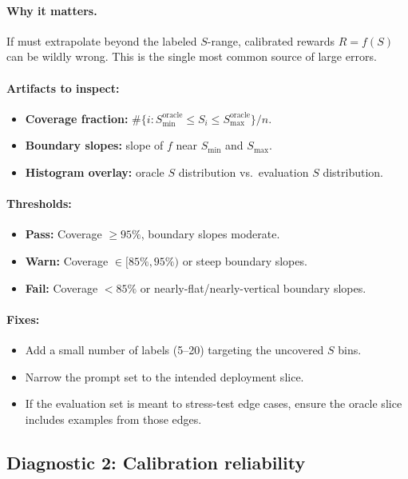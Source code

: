 \paragraph{Why it matters.} If \autocal{} must extrapolate beyond the labeled $S$-range, calibrated rewards $R = f(S)$ can be wildly wrong. This is the single most common source of large errors.

\paragraph{Artifacts to inspect:}
\begin{itemize}
\item \textbf{Coverage fraction:} $\#\{i : S_{\min}^{\text{oracle}} \le S_i \le S_{\max}^{\text{oracle}}\} / n$.
\item \textbf{Boundary slopes:} slope of $f$ near $S_{\min}$ and $S_{\max}$.
\item \textbf{Histogram overlay:} oracle $S$ distribution vs.\ evaluation $S$ distribution.
\end{itemize}

\paragraph{Thresholds:}
\begin{itemize}
\item \textbf{Pass:} Coverage $\ge 95\%$, boundary slopes moderate.
\item \textbf{Warn:} Coverage $\in [85\%, 95\%)$ or steep boundary slopes.
\item \textbf{Fail:} Coverage $< 85\%$ or nearly-flat/nearly-vertical boundary slopes.
\end{itemize}

\paragraph{Fixes:}
\begin{itemize}
\item Add a small number of labels (5--20) targeting the uncovered $S$ bins.
\item Narrow the prompt set to the intended deployment slice.
\item If the evaluation set is meant to stress-test edge cases, ensure the oracle slice includes examples from those edges.
\end{itemize}

\subsection{Diagnostic 2: Calibration reliability}

